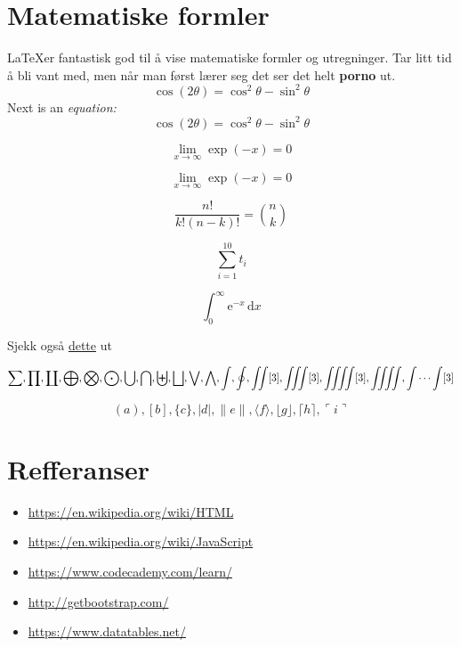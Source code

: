 \documentclass[11pt]{article}
\begin{document}
\section{Matematiske formler}
\LaTeX \space er fantastisk god til å vise matematiske formler og utregninger. Tar litt tid å bli vant med, men når man først lærer seg det ser det helt \textbf{porno} ut. 
$$\cos (2\theta) = \cos^2 \theta - \sin^2 \theta$$
Next is an \textit{equation:}
\begin{equation}
\cos (2\theta) = \cos^2 \theta - \sin^2 \theta
\end{equation}

\begin{equation}\lim_{x \to \infty} \exp(-x) = 0\end{equation}

\begin{equation}\lim_{x \to \infty} \exp(-x) = 0\end{equation}

\begin{equation} \frac{n!}{k!(n-k)!} = \binom{n}{k}\end{equation}

\begin{equation} \displaystyle\sum_{i=1}^{10} t_i\end{equation}

\begin{equation} \int_0^\infty \mathrm{e}^{-x}\,\mathrm{d}x
\end{equation}

Sjekk også \href{https://www.tug.org/texshowcase/#math}{dette} ut

$$
\sum, \prod,	\coprod, \bigoplus, \bigotimes,	\bigodot, \bigcup, \bigcap,\biguplus,\bigsqcup,\bigvee,\bigwedge,\int,\oint,\iint[3],\iiint[3],\iiiint[3],\iiiint,\idotsint[3]
$$

$$
( a ), [ b ], \{ c \}, | d |, \| e \|,
\langle f \rangle, \lfloor g \rfloor,
\lceil h \rceil, \ulcorner i \urcorner
$$




\section{Refferanser}
\begin{itemize}
\item \href{https://en.wikipedia.org/wiki/HTML}{https://en.wikipedia.org/wiki/HTML}
\item \href{https://en.wikipedia.org/wiki/JavaScript}{https://en.wikipedia.org/wiki/JavaScript}
\item \url{https://www.codecademy.com/learn/}
\item \href{http://getbootstrap.com/}{http://getbootstrap.com/}
\item \href{https://www.datatables.net/}{https://www.datatables.net/}
\end{itemize}
 
\end{document}
